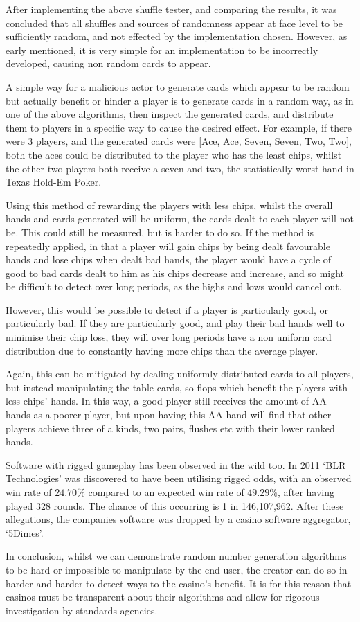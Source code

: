 After implementing the above shuffle tester, and comparing the results,
it was concluded that all shuffles and sources of randomness appear at face
level to be sufficiently random, and not effected by the implementation chosen.
However, as early mentioned, it is very simple for an implementation to be
incorrectly developed, causing non random cards to appear.

A simple way for a malicious actor to generate cards which appear to be random
but actually benefit or hinder a player is to generate cards in a random
way, as in one of the above algorithms, then inspect the generated cards,
and distribute them to players in a specific way to cause the desired effect.
For example, if there were 3 players, and the generated cards were
[Ace, Ace, Seven, Seven, Two, Two], both the aces could be distributed to
the player who has the least chips, whilst the other two players both receive
a seven and two, the statistically worst hand in Texas Hold-Em Poker.

Using this method of rewarding the players with less chips, whilst the overall 
hands and cards generated will be uniform, the cards dealt to each player 
will not be. This could still be measured, but is harder to do so. If the
method is repeatedly applied, in that a player will gain chips by being dealt 
favourable hands and lose chips when dealt bad hands, the player would have 
a cycle of good to bad cards dealt to him as his chips decrease and increase, 
and so might be difficult to detect over long periods, as the highs and lows 
would cancel out.

However, this would be possible to detect if a player is particularly good, or
particularly bad. If they are particularly good, and play their bad hands well
to minimise their chip loss, they will over long periods have a non uniform
card distribution due to constantly having more chips than the average player.

Again, this can be mitigated by dealing uniformly distributed cards to all
players, but instead manipulating the table cards, so flops which benefit
the players with less chips' hands. In this way, a good player still receives
the amount of AA hands as a poorer player, but upon having this AA hand will
find that other players achieve three of a kinds, two pairs, flushes etc
with their lower ranked hands.

Software with rigged gameplay has been observed in the wild too. In 2011 
`BLR Technologies' was discovered to have been utilising rigged odds, with an 
observed win rate of $24.70\%$ compared to an expected win rate of $49.29\%$,
after having played 328 rounds. The chance of this occurring is 1 in 
146,107,962. \parencite{website:shackleford2011} After these allegations, 
the companies software was dropped by a casino software aggregator, `5Dimes'.

In conclusion, whilst we can demonstrate random number generation algorithms
to be hard or impossible to manipulate by the end user, the creator can do so
in harder and harder to detect ways to the casino's benefit. It is for this
reason that casinos must be transparent about their algorithms and allow
for rigorous investigation by standards agencies.
